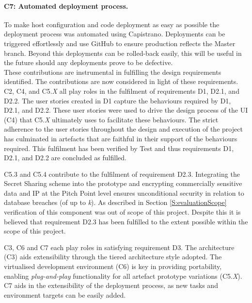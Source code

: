 \paragraph{C7: Automated deployment process.}
 
To make host configuration and code deployment as easy as possible the deployment process was automated using Capistrano. Deployments can be triggered effortlessly and use GitHub to ensure production reflects the Master branch. Beyond this deployments can be rolled-back easily, this will be useful in the future should any deployments prove to be defective.
\\
\newline
These contributions are instrumental in fulfilling the design requirements identified. The contributions are now considered in light of these requirements.
\\
\newline
C2, C4, and C5.{\em X} all play roles in the fulfilment of requirements D1, D2.1, and D2.2. The user stories created in D1 capture the behaviours required by D1, D2.1, and D2.2. These user stories were used to drive the design process of the UI (C4) that C5.{\em X} ultimately uses to facilitate these behaviours. The strict adherence to the user stories throughout the design and execution of the project has culminated in artefacts that are faithful in their support of the behaviours required. This fulfilment has been verified by Test  and thus requirements D1, D2.1, and D2.2 are concluded as fulfilled.

C5.3 and C5.4 contribute to the fulfilment of requirement D2.3. Integrating the Secret Sharing scheme into the prototype and encrypting commercially sensitive data and IP at the Pitch Point level ensures unconditional security in relation to database breaches (of up to \textit{k}). As described in Section \ref{S:evaluationScope} verification of this component was out of scope of this project. Despite this it is believed that requirement D2.3 has been fulfilled to the extent possible within the scope of this project.

C3, C6 and C7 each play roles in satisfying requirement D3. The architecture (C3) aids extensibility through the tiered architecture style adopted. The virtualised development environment (C6) is key in providing portability, enabling \textit{plug-and-play} functionality for all artefact prototype variations (C5.{\em X}). C7 aids in the extensibility of the deployment process, as new tasks and environment targets can be easily added.

